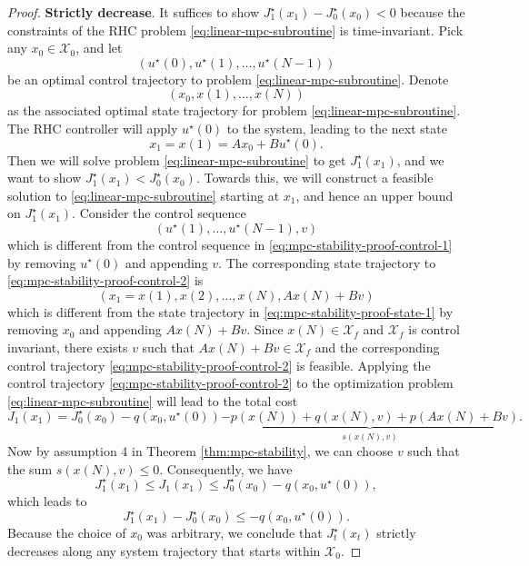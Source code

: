 \documentclass[
]{book}
\theoremstyle{definition}
\theoremstyle{definition}
\theoremstyle{definition}
\theoremstyle{definition}
\theoremstyle{remark}
\begin{document}
\begin{proof}
\textbf{Strictly decrease}. It suffices to show \(J_1^\star(x_1) - J_0^\star(x_0) < 0\) because the constraints of the RHC problem \eqref{eq:linear-mpc-subroutine} is time-invariant. Pick any \(x_0 \in \mathcal{X}_0\), and let
\begin{equation}
\left( u^\star(0),u^\star(1),\dots,u^\star(N-1) \right)
\label{eq:mpc-stability-proof-control-1}
\end{equation}
be an optimal control trajectory to problem \eqref{eq:linear-mpc-subroutine}. Denote
\begin{equation}
\left( x_0,x(1),\dots,x(N) \right)
\label{eq:mpc-stability-proof-state-1}
\end{equation}
as the associated optimal state trajectory for problem \eqref{eq:linear-mpc-subroutine}. The RHC controller will apply \(u^\star(0)\) to the system, leading to the next state
\[
x_1 = x(1) = A x_0 + B u^\star(0).
\]
Then we will solve problem \eqref{eq:linear-mpc-subroutine} to get \(J^\star_1(x_1)\), and we want to show \(J^\star_1(x_1) < J^\star_0(x_0)\). Towards this, we will construct a feasible solution to \eqref{eq:linear-mpc-subroutine} starting at \(x_1\), and hence an upper bound on \(J^\star_1(x_1)\). Consider the control sequence
\begin{equation}
\left( u^\star(1),\dots,u^\star(N-1),v \right)
\label{eq:mpc-stability-proof-control-2}
\end{equation}
which is different from the control sequence in \eqref{eq:mpc-stability-proof-control-1} by removing \(u^\star(0)\) and appending \(v\). The corresponding state trajectory to \eqref{eq:mpc-stability-proof-control-2} is
\begin{equation}
\left( x_1 = x(1), x(2),\dots,x(N), Ax(N) + Bv \right)
\label{eq:mpc-stability-proof-state-2}
\end{equation}
which is different from the state trajectory in \eqref{eq:mpc-stability-proof-state-1} by removing \(x_0\) and appending \(A x(N) + Bv\). Since \(x(N) \in \mathcal{X}_f\) and \(\mathcal{X}_f\) is control invariant, there exists \(v\) such that \(Ax(N) + Bv \in \mathcal{X}_f\) and the corresponding control trajectory \eqref{eq:mpc-stability-proof-control-2} is feasible. Applying the control trajectory \eqref{eq:mpc-stability-proof-control-2} to the optimization problem \eqref{eq:linear-mpc-subroutine} will lead to the total cost
\[
J_1(x_1) = J_0^\star(x_0) - q(x_0,u^\star(0)) \underbrace{- p(x(N)) + q(x(N),v) + p(Ax(N) + Bv)}_{s(x(N),v)}.
\]
Now by assumption 4 in Theorem \ref{thm:mpc-stability}, we can choose \(v\) such that the sum \(s(x(N),v) \leq 0\). Consequently, we have
\[
J_1^\star(x_1) \leq J_1(x_1) \leq J_0^\star(x_0) - q(x_0,u^\star(0)),
\]
which leads to
\[
J_1^\star(x_1) - J_0^\star(x_0) \leq - q(x_0,u^\star(0)).
\]
Because the choice of \(x_0\) was arbitrary, we conclude that \(J_t^\star(x_t)\) strictly decreases along any system trajectory that starts within \(\mathcal{X}_0\).


\end{proof}
\end{document}
